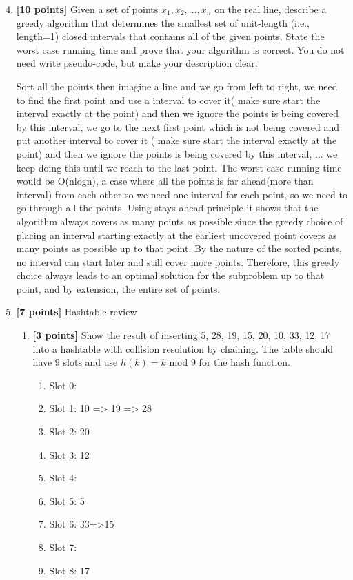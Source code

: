 \documentclass[11pt]{article}
\begin{document}
\begin{enumerate}

\setcounter{enumi}{3}


\item \textbf{[10 points]} Given a set of points ${x_1, x_2, ..., x_n}$ on the real line, describe a greedy algorithm that determines the smallest set of unit-length (i.e., length=1) closed intervals that contains all of the given points.  State the worst case running time and prove that your algorithm is correct.  You do not need write pseudo-code, but make your description clear.

Sort all the points then imagine a line and we go from left to right, we need to find the first point and use a interval to cover it( make sure start the interval exactly at the point) and then we ignore the points is being covered by this interval, we go to the next first point which is not being covered and put another interval to cover it ( make sure start the interval exactly at the point) and then we ignore the points is being covered by this interval, ... we keep doing this until we reach to the last point.  The worst case running time would be O(nlogn), a case where all the points is far ahead(more than interval) from each other so we need one interval for each point, so we need to go through all the points.  Using stays ahead principle it shows that the algorithm  always covers as many points as possible since the greedy choice of placing an interval starting exactly at the earliest uncovered point covers as many points as possible up to that point. By the nature of the sorted points, no interval can start later and still cover more points. Therefore, this greedy choice always leads to an optimal solution for the subproblem up to that point, and by extension, the entire set of points.

\item \textbf{[7 points]} Hashtable review

\begin{enumerate}

\item \textbf{[3 points]} Show the result of inserting 5, 28, 19, 15, 20, 10, 33, 12, 17 into a hashtable with collision resolution by chaining.  The table should have 9 slots and use $h(k) = k$ mod $9$ for the hash function.

\begin{enumerate}
    \item Slot 0: 
    \item Slot 1: 10 => 19 => 28
    \item Slot 2: 20
    \item Slot 3: 12
    \item Slot 4: 
    \item Slot 5: 5
    \item Slot 6: 33=>15
    \item Slot 7: 
    \item Slot 8: 17
\end{enumerate}



\end{enumerate}
\end{enumerate}
\end{document}
